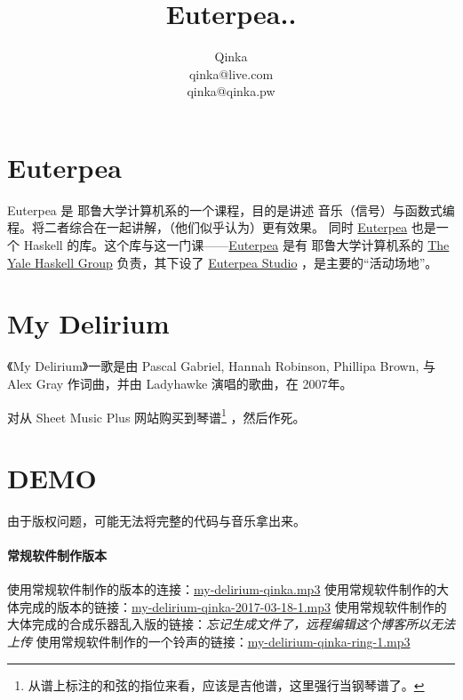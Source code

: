 \documentclass{ctexart}
\author{Qinka \\ qinka@live.com \\ qinka@qinka.pw}
\title{Euterpea..}
\begin{document}
\section{Euterpea}

Euterpea 是 耶鲁大学计算机系的一个课程，目的是讲述 音乐（信号）与函数式编程。将二者综合在一起讲解，（他们似乎认为）更有效果。
同时 \href{http://www.euterpea.com}{Euterpea} 也是一个 Haskell 的库。这个库与这一门课——\href{http://haskell.cs.yale.edu/euterpea/}{Euterpea}
是有 耶鲁大学计算机系的 \href{http://haskell.cs.yale.edu}{The Yale Haskell Group} 负责，其下设了
\href{http://haskell.cs.yale.edu/euterpea/euterpea-studio/}{Euterpea Studio} ，是主要的“活动场地”。

\section{My Delirium}

《My Delirium》一歌是由 Pascal Gabriel, Hannah Robinson, Phillipa Brown, 与 Alex Gray 作词曲，并由 Ladyhawke 演唱的歌曲，在 2007年。

对从 Sheet Music Plus 网站购买到琴谱\footnote{从谱上标注的和弦的指位来看，应该是吉他谱，这里强行当钢琴谱了。} ，然后作死。


\section{DEMO}

由于版权问题，可能无法将完整的代码与音乐拿出来。

\paragraph{常规软件制作版本}
使用常规软件制作的版本的连接：\href{/res/music/my-delirium-qinka.mp3}{my-delirium-qinka.mp3}
使用常规软件制作的大体完成的版本的链接：\href{/res/music/my-delirium-qinka-2017-03-18-1.mp3}{my-delirium-qinka-2017-03-18-1.mp3}
使用常规软件制作的大体完成的合成乐器乱入版的链接：\textit{忘记生成文件了，远程编辑这个博客所以无法上传}
使用常规软件制作的一个铃声的链接：\href{/res/music/my-delirium-qinka-ring-1.mp3}{my-delirium-qinka-ring-1.mp3}
\end{document}
